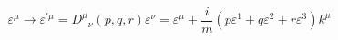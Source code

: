 \begin{equation}
\varepsilon^{\mu} \rightarrow \varepsilon^{\prime \mu} = {D^{\mu}}_{\nu}(p,q,r)\varepsilon^{\nu} = \varepsilon^{\mu} + \frac{i}{m}(p\varepsilon^1 +
q \varepsilon^2 + r  \varepsilon^3)k^{\mu}
\label{622}
\end{equation}

